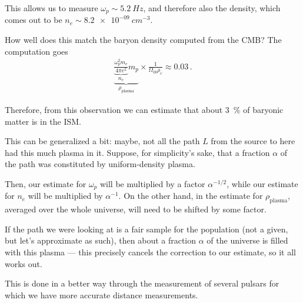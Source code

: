 \documentclass[main.tex]{subfiles}
\begin{document}
This allows us to measure \(\omega _p \sim \SI{5.2}{Hz}\), and therefore also the density, which comes out to be \(n_e \sim \SI{8.2e-09}{cm^{-3}}\).

\begin{extracontent}
How well does this match the baryon density computed from the CMB? 
The computation goes  
%
\begin{align}
\underbrace{\underbrace{\frac{\omega _p^2 m_e}{4 \pi e^2}}_{n_e} m_p}_{\rho _{\text{plasma}}} \times \frac{1}{\Omega _{0b} \rho _c} \approx 0.03
\,.
\end{align}

Therefore, from this observation we can estimate that about \SI{3}{\percent} of baryonic matter is in the ISM. 

This can be generalized a bit: maybe, not all the path \(L\) from the source to here had this much plasma in it. 
Suppose, for simplicity's sake, that a fraction \(\alpha \) of the path was constituted by uniform-density plasma. 

Then, our estimate for \(\omega _p\) will be multiplied by a factor \(\alpha^{-1/2}\), while our estimate for \(n_e\) will be multiplied by \(\alpha^{-1}\). 
On the other hand, in the estimate for \(\rho _{\text{plasma}}\), averaged over the whole universe, will need to be shifted by some factor. 

If the path we were looking at is a fair sample for the population (not a given, but let's approximate as such), then about a fraction \(\alpha \) of the universe is filled with this plasma --- this precisely cancels the correction to our estimate, so it all works out. 

This is done in a better way through the measurement of several pulsars for which we have more accurate distance measurements.
\end{extracontent}

\end{document}
